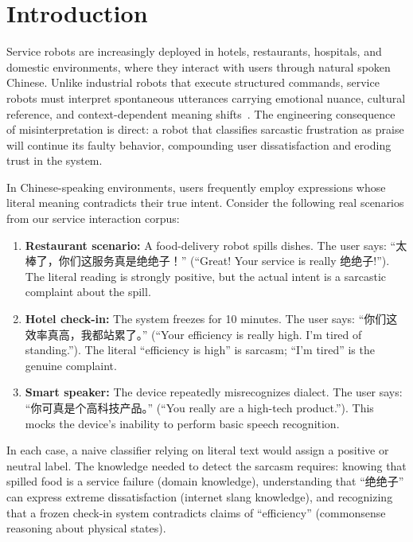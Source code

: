 \documentclass[conference]{IEEEtran}
\begin{document}
\section{Introduction}

Service robots are increasingly deployed in hotels, restaurants, hospitals, and
domestic environments, where they interact with users through natural spoken Chinese.
Unlike industrial robots that execute structured commands, service robots must interpret
spontaneous utterances carrying emotional nuance, cultural reference, and
context-dependent meaning shifts~\cite{kim2024survey}.
The engineering consequence of misinterpretation is direct: a robot that classifies
sarcastic frustration as praise will continue its faulty behavior, compounding
user dissatisfaction and eroding trust in the system.

In Chinese-speaking environments, users frequently employ expressions whose literal
meaning contradicts their true intent. Consider the following real scenarios from our
service interaction corpus:

\begin{enumerate}[leftmargin=*]
    \item \textbf{Restaurant scenario:} A food-delivery robot spills dishes.
    The user says: ``太棒了，你们这服务真是绝绝子！'' (``Great! Your service is
    really 绝绝子!''). The literal reading is strongly positive, but the actual
    intent is a sarcastic complaint about the spill.
    \item \textbf{Hotel check-in:} The system freezes for 10 minutes.
    The user says: ``你们这效率真高，我都站累了。'' (``Your efficiency is really high.
    I'm tired of standing.''). The literal ``efficiency is high'' is sarcasm;
    ``I'm tired'' is the genuine complaint.
    \item \textbf{Smart speaker:} The device repeatedly misrecognizes dialect.
    The user says: ``你可真是个高科技产品。'' (``You really are a high-tech product.'').
    This mocks the device's inability to perform basic speech recognition.
\end{enumerate}

In each case, a naive classifier relying on literal text would assign a positive or
neutral label. The knowledge needed to detect the sarcasm requires: knowing that
spilled food is a service failure (domain knowledge), understanding that ``绝绝子''
can express extreme dissatisfaction (internet slang knowledge), and
recognizing that a frozen check-in system contradicts claims of ``efficiency''
(commonsense reasoning about physical states).
\end{document}
